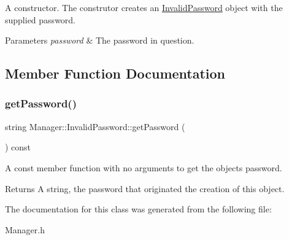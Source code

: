 A constructor. The construtor creates an \hyperlink{class_manager_1_1_invalid_password}{Invalid\+Password} object with the supplied password. 
\begin{DoxyParams}{Parameters}
{\em password} & The password in question. \\
\hline
\end{DoxyParams}


\subsection{Member Function Documentation}
\hypertarget{class_manager_1_1_invalid_password_a50dac6f3a960996704aad8613aace04b}{}\label{class_manager_1_1_invalid_password_a50dac6f3a960996704aad8613aace04b} 
\subsubsection{\texorpdfstring{get\+Password()}{getPassword()}}
{\footnotesize\ttfamily string Manager\+::\+Invalid\+Password\+::get\+Password (\begin{DoxyParamCaption}{ }\end{DoxyParamCaption}) const\hspace{0.3cm}{\ttfamily [inline]}}

A const member function with no arguments to get the object\textquotesingle{}s password. \begin{DoxyReturn}{Returns}
A string, the password that originated the creation of this object. 
\end{DoxyReturn}


The documentation for this class was generated from the following file\+:\begin{DoxyCompactItemize}
\item 
Manager.\+h\end{DoxyCompactItemize}
